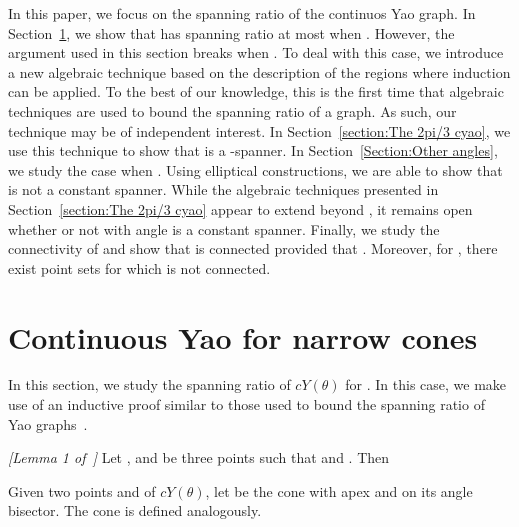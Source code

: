 \documentclass{cccg14}
\newcommand{\cyao}{\ensuremath{cY(\theta)}\xspace}
\begin{document}
In this paper, we focus on the spanning ratio of the continuos Yao graph.
In Section~\ref{section:Small cones}, we show that  has spanning ratio at most  when . 
However, the argument used in this section breaks when . To deal with this case, we introduce a new algebraic technique based on the description of the regions where induction can be applied.
To the best of our knowledge, this is the first time that algebraic techniques are used to bound the spanning ratio of a graph. 
As such, our technique may be of independent interest. In Section~\ref{section:The 2pi/3 cyao}, we use this technique to show that  is a -spanner.
In Section~\ref{Section:Other angles}, we study the case when . Using elliptical constructions, we are able to show that  is not a constant spanner. While the algebraic techniques presented in Section~\ref{section:The 2pi/3 cyao} appear to extend beyond , it remains open whether or not  with angle  is a constant spanner.
Finally, we study the connectivity of  and show that  is connected provided that . Moreover, for , there exist point sets for which  is not connected.

\vspace{-0.5em}
\section{Continuous Yao for narrow cones}\label{section:Small cones}

In this section, we study the spanning ratio of \cyao for . 
In this case, we make use of an inductive proof similar to those used to bound the spanning ratio of Yao graphs~\cite{barba2014new}.

\vspace{-0.2em}
\begin{lemma}
 \label{lem:basicyao}\emph{[Lemma 1 of~\cite{barba2014new}]}
Let ,  and  be three points such that  and . Then\vspace{-.1in}

\end{lemma}
Given two points  and  of \cyao,
let  be the cone with apex  and  on its angle bisector.
The cone  is defined analogously.
\end{document}
